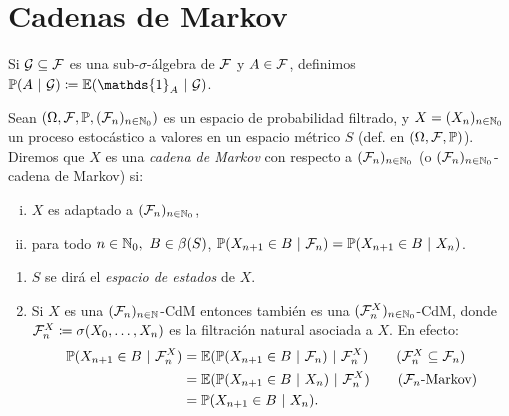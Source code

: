 \chapter{Cadenas de Markov}


\begin{notation}
	Si $\mathcal{G} \subseteq \mathcal{F}$ es una sub-$\sigma$-álgebra de $\mathcal{F}$ y $A \in \mathcal{F}$, definimos $\mbb{P}(A \ | \ \mcal{G}) \coloneq \mbb{E}(\mathds{1}_{A} \ | \ \mcal{G})$.
\end{notation}

\begin{definition}
	Sean $(\Omega, \mathcal{F}, \mathbb{P}, (\mathcal{F}_{n})_{n \in \mathbb{N}_{0}})$ es un espacio de probabilidad filtrado, y $X = (X_{n})_{n \in \mathbb{N}_{0}}$ un proceso estocástico a valores en un espacio métrico $S$ (def. en $(\Omega, \mathcal{F}, \mathbb{P})$). Diremos que $X$ es una \textit{cadena de Markov} con respecto a $(\mathcal{F}_{n})_{n \in \mathbb{N}_{0}}$ (o $(\mathcal{F}_{n})_{n \in \mathbb{N}_{0}}$-cadena de Markov) si:
	\begin{enumerate}[(i)]
		\item $X$ es adaptado a $(\mathcal{F}_{n})_{n \in \mathbb{N}_{0}}$,

		\item para todo $n \in \mathbb{N}_{0},\ B \in \beta(S)$, $\mbb{P}(X_{n+1} \in B \ | \ \mcal{F}_{n}) = \mbb{P}(X_{n+1} \in B \ | \ X_{n})$.
	\end{enumerate}
\end{definition}

\begin{comentarios}
	\begin{enumerate}
		\item $S$ se dirá el \textit{espacio de estados} de $X$.

		\item Si $X$ es una $(\mathcal{F}_{n})_{n \in \mathbb{N}}$-CdM entonces también es una $(\mathcal{F}_{n}^{X})_{n \in \mathbb{N}_{0}}$-CdM, donde $\mathcal{F}_{n}^{X} \coloneq \sigma(X_{0},\dots,X_{n})$ es la filtración natural asociada a $X$. En efecto:
		\begin{align*}
			\mbb{P}(X_{n+1} \in B \ | \ \mcal{F}_{n}^{X}) &= \mbb{E}(\mbb{P}(X_{n+1} \in B \ | \ \mcal{F}_{n}) \ | \ \mcal{F}_{n}^{X}) \tag{$\mcal{F}_{n}^{X} \subseteq \mcal{F}_{n}$} \\
			&= \mbb{E}(\mbb{P}(X_{n+1} \in B \ | \ X_{n}) \ | \ \mcal{F}_{n}^{X}) \tag{$\mcal{F}_{n} \text{-Markov}$}\\
			&= \mbb{P}(X_{n+1} \in B \ | \ X_{n})
		.\end{align*}
	\end{enumerate}
\end{comentarios}

